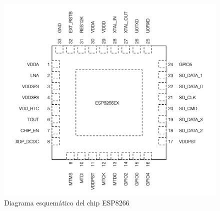 \begin{figure}[H]
	\centering
	\includegraphics[scale=.3]{Capitulo2/images/esp8266.png}
	\caption{Diagrama esquemático del chip ESP8266}
	\label{fig:diagrama_dispensador}
\end{figure}

\pagebreak

